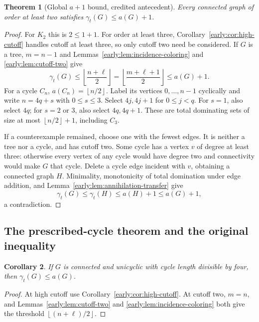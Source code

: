 \documentclass[11pt,a4paper]{article}
\newtheorem{theorem}{Theorem}[section]
\newtheorem{corollary}[theorem]{Corollary}
\theoremstyle{definition}\newtheorem{definition}[theorem]{Definition}
\theoremstyle{remark}\newtheorem{remark}[theorem]{Remark}
\newcommand{\floor}[1]{\left\lfloor#1\right\rfloor}
\begin{document}
\begin{theorem}[Global $a+1$ bound, credited antecedent]
\label{early:thm:global-a-plus-one}
Every connected graph of order at least two satisfies
$\gamma_t(G)\leq a(G)+1$.
\end{theorem}
\begin{proof}
For $K_2$ this is $2\leq1+1$.  For order at least three,
Corollary~\ref{early:cor:high-cutoff} handles cutoff at least
three, so only cutoff two need be considered.  If $G$ is a tree,
$m=n-1$ and Lemmas~\ref{early:lem:incidence-coloring} and
\ref{early:lem:cutoff-two} give
\[
 \gamma_t(G)\leq\floor{\frac{n+\ell}{2}}
 =\floor{\frac{m+\ell+1}{2}}\leq a(G)+1.
\]
For a cycle $C_n$, $a(C_n)=\floor{n/2}$.  Label its vertices
$0,\ldots,n-1$ cyclically and write $n=4q+s$ with $0\leq s\leq3$.
Select $4j,4j+1$ for $0\leq j<q$.  For $s=1$, also select $4q$;
for $s=2$ or $3$, also select $4q,4q+1$.  These are total
dominating sets of size at most $\floor{n/2}+1$, including $C_3$.

If a counterexample remained, choose one with the fewest edges.
It is neither a tree nor a cycle, and has cutoff two.  Some cycle
has a vertex $v$ of degree at least three: otherwise every vertex
of any cycle would have degree two and connectivity would make
$G$ that cycle.  Delete a cycle edge incident with $v$, obtaining
a connected graph $H$.  Minimality, monotonicity of total domination
under edge addition, and
Lemma~\ref{early:lem:annihilation-transfer} give
\[
 \gamma_t(G)\leq\gamma_t(H)\leq a(H)+1\leq a(G)+1,
\]
a contradiction.
\end{proof}

\subsection{The prescribed-cycle theorem and the original inequality}

\begin{corollary}
\label{early:cor:unicyclic-4k}
If $G$ is connected and unicyclic with cycle length divisible by
four, then $\gamma_t(G)\leq a(G)$.
\end{corollary}
\begin{proof}
At high cutoff use Corollary~\ref{early:cor:high-cutoff}.  At
cutoff two, $m=n$, and
Lemmas~\ref{early:lem:cutoff-two} and
\ref{early:lem:incidence-coloring} both give the threshold
$\floor{(n+\ell)/2}$.
\end{proof}
\end{document}
